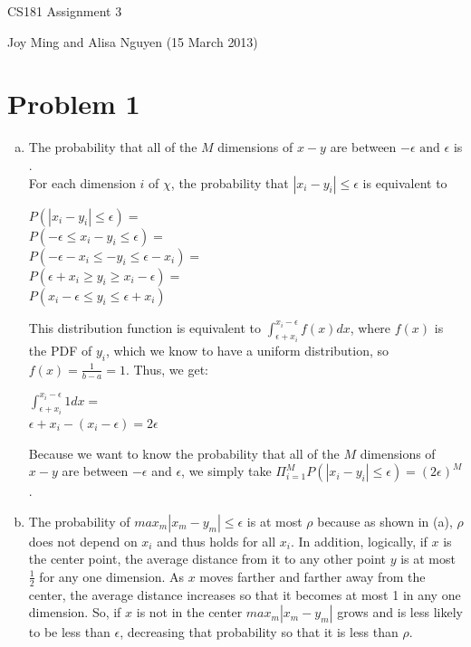 \documentclass[11pt]{article}
\begin{document}
\begin{center}
\large
CS181 Assignment 3
\end{center}
Joy Ming and Alisa Nguyen (15 March 2013)\\

\section{Problem 1}
\begin{enumerate}[a.]
\item The probability that all of the $M$ dimensions of $x - y$ are between $-\epsilon \text{ and } \epsilon$ is .
\\ For each dimension $i$ of $\chi$, the probability that $|x_i - y_i| \leq \epsilon$ is equivalent to
\begin{center}
$P(|x_i - y_i| \leq \epsilon) = $ \\
$P(- \epsilon \leq x_i - y_i \leq \epsilon) = $ \\
$P(- \epsilon - x_i \leq - y_i \leq \epsilon - x_i) = $ \\
$P(\epsilon + x_i \geq y_i \geq x_i - \epsilon) = $ \\
$P(x_i - \epsilon \leq y_i \leq \epsilon + x_i)$
\end{center}
This distribution function is equivalent to $\int_{\epsilon + x_i}^{x_i - \epsilon} f(x)dx$, where $f(x)$ is the PDF of $y_i$, which we know to have a uniform distribution, so $f(x) = \frac{1}{b - a} = 1$. Thus, we get:
\begin{center}
$\int_{\epsilon + x_i}^{x_i - \epsilon} 1 dx = $ \\
$\epsilon + x_i - (x_i - \epsilon) = 2\epsilon$
\end{center}
Because we want to know the probability that all of the $M$ dimensions of $x - y$ are between $-\epsilon$ and $\epsilon$, we simply take $\Pi_{i = 1}^{M} P(|x_i - y_i| \leq \epsilon) = (2\epsilon)^M$.
\item The probability of $max_m |x_m - y_m| \leq \epsilon$ is at most $\rho$ because as shown in (a), $\rho$ does not depend on $x_i$ and thus holds for all $x_i$. In addition, logically, if $x$ is the center point, the average distance from it to any other point $y$ is at most $\frac{1}{2}$ for any one dimension. As $x$ moves farther and farther away from the center, the average distance increases so that it becomes at most 1 in any one dimension. So, if $x$ is not in the center $max_m|x_m - y_m|$ grows and is less likely to be less than $\epsilon$, decreasing that probability so that it is less than $\rho$.

\end{enumerate}
\end{document}
